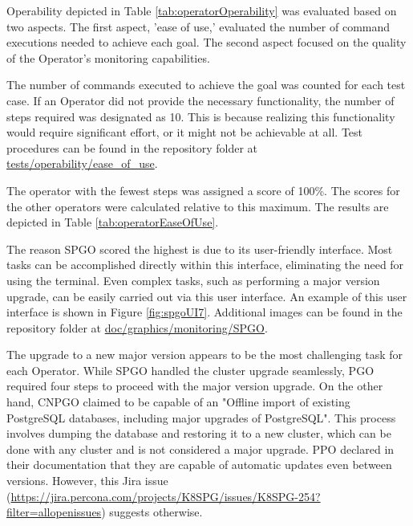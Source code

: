 Operability depicted in Table \ref{tab:operatorOperability} was evaluated based on two aspects. The first aspect, 'ease of use,' evaluated the number of command executions needed to achieve each goal. The second aspect focused on the quality of the Operator's monitoring capabilities.


The number of commands executed to achieve the goal was counted for each test case. If an Operator did not provide the necessary functionality, the number of steps required was designated as 10. This is because realizing this functionality would require significant effort, or it might not be achievable at all.
Test procedures can be found in the repository folder at \url{tests/operability/ease_of_use}.

The operator with the fewest steps was assigned a score of 100\%. The scores for the other operators were calculated relative to this maximum. The results are depicted in Table \ref{tab:operatorEaseOfUse}.

The reason SPGO scored the highest is due to its user-friendly interface. Most tasks can be accomplished directly within this interface, eliminating the need for using the terminal. Even complex tasks, such as performing a major version upgrade, can be easily carried out via this user interface. An example of this user interface is shown in Figure \ref{fig:spgoUI7}. Additional images can be found in the repository folder at \url{doc/graphics/monitoring/SPGO}.

The upgrade to a new major version appears to be the most challenging task for each Operator. While SPGO handled the cluster upgrade seamlessly, PGO required four steps to proceed with the major version upgrade. On the other hand, CNPGO claimed to be capable of an "Offline import of existing PostgreSQL databases, including major upgrades of PostgreSQL". This process involves dumping the database and restoring it to a new cluster, which can be done with any cluster and is not considered a major upgrade. PPO declared in their documentation that they are capable of automatic updates even between versions. However, this Jira issue (\url{https://jira.percona.com/projects/K8SPG/issues/K8SPG-254?filter=allopenissues}) suggests otherwise.

